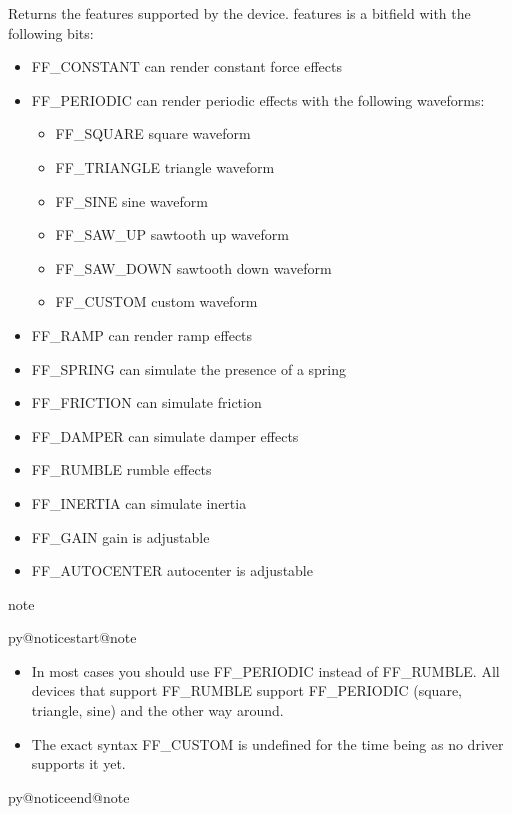 \documentclass[a4paper,8pt,english]{sphinxmanual}
\makeatletter
\renewenvironment{notice}[2]{%
          \def\py@noticetype{#1}
          \begin{coloredbox}{#1}
          \bf\it
          \par\strong{#2}
          \csname py@noticestart@#1\endcsname
        }
	{
          \csname py@noticeend@\py@noticetype\endcsname
          \end{coloredbox}
        }
\makeatother
\begin{document}
Returns the features supported by the device. features is a bitfield with the
following bits:
\begin{itemize}
\item {} 
FF\_CONSTANT   can render constant force effects

\item {} 
FF\_PERIODIC   can render periodic effects with the following waveforms:
\begin{itemize}
\item {} 
FF\_SQUARE     square waveform

\item {} 
FF\_TRIANGLE   triangle waveform

\item {} 
FF\_SINE       sine waveform

\item {} 
FF\_SAW\_UP     sawtooth up waveform

\item {} 
FF\_SAW\_DOWN   sawtooth down waveform

\item {} 
FF\_CUSTOM     custom waveform

\end{itemize}

\item {} 
FF\_RAMP       can render ramp effects

\item {} 
FF\_SPRING     can simulate the presence of a spring

\item {} 
FF\_FRICTION   can simulate friction

\item {} 
FF\_DAMPER     can simulate damper effects

\item {} 
FF\_RUMBLE     rumble effects

\item {} 
FF\_INERTIA    can simulate inertia

\item {} 
FF\_GAIN       gain is adjustable

\item {} 
FF\_AUTOCENTER autocenter is adjustable

\end{itemize}

\begin{notice}{note}{Note:}\begin{itemize}
\item {} 
In most cases you should use FF\_PERIODIC instead of FF\_RUMBLE. All
devices that support FF\_RUMBLE support FF\_PERIODIC (square, triangle,
sine) and the other way around.

\item {} 
The exact syntax FF\_CUSTOM is undefined for the time being as no driver
supports it yet.

\end{itemize}
\end{notice}
\end{document}
